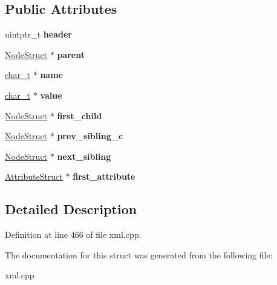 \subsection*{Public Attributes}
\begin{DoxyCompactItemize}
\item 
\hypertarget{structphys_1_1xml_1_1NodeStruct_a68ff269f03bdab91cbeb96174d4df3a8}{
uintptr\_\-t {\bfseries header}}
\label{d7/dd5/structphys_1_1xml_1_1NodeStruct_a68ff269f03bdab91cbeb96174d4df3a8}

\item 
\hypertarget{structphys_1_1xml_1_1NodeStruct_a691cde3ddaad2c7dacf780a6c4b9c8fe}{
\hyperlink{structphys_1_1xml_1_1NodeStruct}{NodeStruct} $\ast$ {\bfseries parent}}
\label{d7/dd5/structphys_1_1xml_1_1NodeStruct_a691cde3ddaad2c7dacf780a6c4b9c8fe}

\item 
\hypertarget{structphys_1_1xml_1_1NodeStruct_aa5b83907bbb2a8d90b0ce8be10e30be2}{
\hyperlink{namespacephys_1_1xml_afc87705cd1c2917d87b879715a2d8f6e}{char\_\-t} $\ast$ {\bfseries name}}
\label{d7/dd5/structphys_1_1xml_1_1NodeStruct_aa5b83907bbb2a8d90b0ce8be10e30be2}

\item 
\hypertarget{structphys_1_1xml_1_1NodeStruct_afc220369e23ebde109283016277c715c}{
\hyperlink{namespacephys_1_1xml_afc87705cd1c2917d87b879715a2d8f6e}{char\_\-t} $\ast$ {\bfseries value}}
\label{d7/dd5/structphys_1_1xml_1_1NodeStruct_afc220369e23ebde109283016277c715c}

\item 
\hypertarget{structphys_1_1xml_1_1NodeStruct_a54bd4cd90f2d96af65396da7ec25b64e}{
\hyperlink{structphys_1_1xml_1_1NodeStruct}{NodeStruct} $\ast$ {\bfseries first\_\-child}}
\label{d7/dd5/structphys_1_1xml_1_1NodeStruct_a54bd4cd90f2d96af65396da7ec25b64e}

\item 
\hypertarget{structphys_1_1xml_1_1NodeStruct_ab803e620f77fc53cdbb313702e9de966}{
\hyperlink{structphys_1_1xml_1_1NodeStruct}{NodeStruct} $\ast$ {\bfseries prev\_\-sibling\_\-c}}
\label{d7/dd5/structphys_1_1xml_1_1NodeStruct_ab803e620f77fc53cdbb313702e9de966}

\item 
\hypertarget{structphys_1_1xml_1_1NodeStruct_ac27e3b46b9dba081310408320ff66301}{
\hyperlink{structphys_1_1xml_1_1NodeStruct}{NodeStruct} $\ast$ {\bfseries next\_\-sibling}}
\label{d7/dd5/structphys_1_1xml_1_1NodeStruct_ac27e3b46b9dba081310408320ff66301}

\item 
\hypertarget{structphys_1_1xml_1_1NodeStruct_a5491eb5936a4b99cd2447332e4a9fdb2}{
\hyperlink{structphys_1_1xml_1_1AttributeStruct}{AttributeStruct} $\ast$ {\bfseries first\_\-attribute}}
\label{d7/dd5/structphys_1_1xml_1_1NodeStruct_a5491eb5936a4b99cd2447332e4a9fdb2}

\end{DoxyCompactItemize}


\subsection{Detailed Description}


Definition at line 466 of file xml.cpp.



The documentation for this struct was generated from the following file:\begin{DoxyCompactItemize}
\item 
xml.cpp\end{DoxyCompactItemize}
